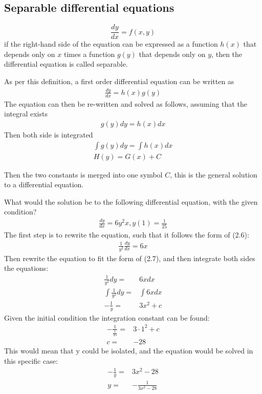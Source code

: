 \subsection{Separable differential equations} \label{SDE}
\begin{tcolorbox}[colback=blue!5!white,colframe=blue!75!black,title=Definition: Separable equation] 
    $$\frac{dy}{dx} = f(x,y)$$
    if the right-hand side of the equation can be expressed as   a function $h(x)$ that depends only on $x$ times a function $g(y)$ that depends only on $y$, then the differential equation is called separable.
   \end{tcolorbox}
As per this definition, a first order differential equation can be written as
\begin{align}
	\frac{dy}{dx}=h(x)g(y)
\end{align}
The equation can then be re-written and solved as follows, assuming that the integral exists
\begin{align}
	g(y)dy=h(x)dx
\end{align}
Then both side is integrated
 \begin{align}
 \int g(y)dy =\int h(x)dx   \\
 H(y)=G(x)+C
 \end{align}
 
Then the two constants is merged into one symbol $C$, this is the general solution to a differential equation. \citep{diffandcomplex}

\begin{tcolorbox}[colback=red!5!white,colframe=red!75!black,title=Example using separable differential equation] 
What would the solution be to the following differential equation, with the given condition?
\begin{align*}
	\frac{dy}{dx} = 6y^2x, y(1)=\frac{1}{25}
\end{align*}
The first step is to rewrite the equation, such that it follows the form of (2.6):
\begin{align*}
	\frac{1}{y^2}\frac{dy}{dx}=6x
\end{align*}
Then rewrite the equation to fit the form of (2.7), and then integrate both sides the equations:
\begin{align*}
	\frac{1}{y^2}dy=&6x dx				\\
	\int \frac{1}{y^2}dy=&\int 6x dx		\\
	-\frac{1}{y}=&3x^2+c		
\end{align*}
Given the initial condition the integration constant can be found:
\begin{align*}
	-\frac{1}{\frac{1}{25}}=&3\cdot 1^2+c	\\
	c=&-28
\end{align*}
This would mean that y could be isolated, and the equation would be solved in this specific case:
\begin{align*}
	-\frac{1}{y}=&3x^2-28\\
	y=&-\frac{1}{3x^2-28}
\end{align*}
\end{tcolorbox}


